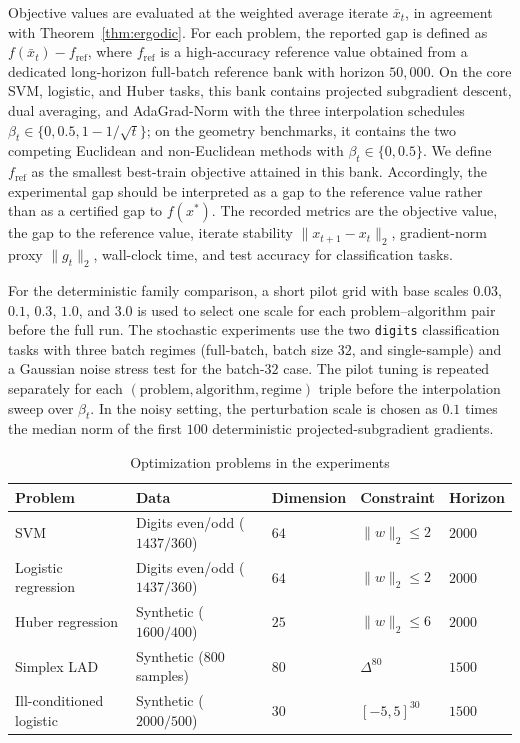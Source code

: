\documentclass[11pt]{article}
\theoremstyle{definition}
\theoremstyle{remark}
\newcommand{\norm}[1]{\lVert #1 \rVert}
\begin{document}
Objective values are evaluated at the weighted average iterate $\bar{x}_t$, in agreement with Theorem~\ref{thm:ergodic}. For each problem, the reported gap is defined as $f(\bar{x}_t)-f_{\mathrm{ref}}$, where $f_{\mathrm{ref}}$ is a high-accuracy reference value obtained from a dedicated long-horizon full-batch reference bank with horizon $50{,}000$. On the core SVM, logistic, and Huber tasks, this bank contains projected subgradient descent, dual averaging, and AdaGrad-Norm with the three interpolation schedules $\beta_t \in \{0,0.5,1-1/\sqrt{t}\}$; on the geometry benchmarks, it contains the two competing Euclidean and non-Euclidean methods with $\beta_t \in \{0,0.5\}$. We define $f_{\mathrm{ref}}$ as the smallest best-train objective attained in this bank. Accordingly, the experimental gap should be interpreted as a gap to the reference value rather than as a certified gap to $f(x^*)$. The recorded metrics are the objective value, the gap to the reference value, iterate stability $\norm{x_{t+1}-x_t}_2$, gradient-norm proxy $\norm{g_t}_2$, wall-clock time, and test accuracy for classification tasks.

For the deterministic family comparison, a short pilot grid with base scales $0.03$, $0.1$, $0.3$, $1.0$, and $3.0$ is used to select one scale for each problem--algorithm pair before the full run. The stochastic experiments use the two \texttt{digits} classification tasks with three batch regimes (full-batch, batch size $32$, and single-sample) and a Gaussian noise stress test for the batch-$32$ case. The pilot tuning is repeated separately for each $(\text{problem}, \text{algorithm}, \text{regime})$ triple before the interpolation sweep over $\beta_t$. In the noisy setting, the perturbation scale is chosen as $0.1$ times the median norm of the first $100$ deterministic projected-subgradient gradients.

\begin{table}[H]
    \centering
    \caption{Optimization problems in the experiments}
    \label{tab:problems}
    \small
    \begin{tabular}{lllll}
        \toprule
        Problem & Data & Dimension & Constraint & Horizon \\
        \midrule
        SVM & Digits even/odd ($1437/360$) & $64$ & $\norm{w}_2 \leq 2$ & $2000$ \\
        Logistic regression & Digits even/odd ($1437/360$) & $64$ & $\norm{w}_2 \leq 2$ & $2000$ \\
        Huber regression & Synthetic ($1600/400$) & $25$ & $\norm{w}_2 \leq 6$ & $2000$ \\
        Simplex LAD & Synthetic ($800$ samples) & $80$ & $\Delta^{80}$ & $1500$ \\
        Ill-conditioned logistic & Synthetic ($2000/500$) & $30$ & $[-5,5]^{30}$ & $1500$ \\
        \bottomrule
    \end{tabular}
\end{table}
\end{document}
